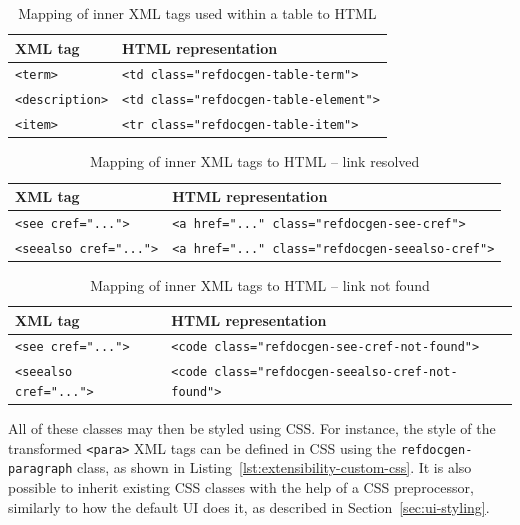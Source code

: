 \begin{table}[H]
\centering
\begin{tabular}{|p{5cm}|p{8cm}|}
\hline
\textbf{XML tag} & \textbf{HTML representation} \\ \hline
\texttt{<term>} & \texttt{<td class="refdocgen-table-term">} \\ \hline
\texttt{<description>} & \texttt{<td class="refdocgen-table-element">} \\ \hline
\texttt{<item>} & \texttt{<tr class="refdocgen-table-item">} \\ \hline
\end{tabular}
\caption{Mapping of inner XML tags used within a table to HTML}
\label{table:default-xml-config-inside-table}
\end{table}

\begin{table}[H]
\centering
\begin{tabular}{|p{5cm}|p{8cm}|}
\hline
\textbf{XML tag} & \textbf{HTML representation} \\ \hline
\texttt{<see cref="...">} & \texttt{<a href="..." class="refdocgen-see-cref">} \\ \hline
\texttt{<seealso cref="...">} & \texttt{<a href="..." class="refdocgen-seealso-cref">} \\ \hline
\end{tabular}
\caption{Mapping of inner XML tags to HTML -- link resolved}
\label{table:default-xml-config-cref-found}
\end{table}

\begin{table}[H]
\centering
\begin{tabular}{|p{5cm}|p{8cm}|}
\hline
\textbf{XML tag} & \textbf{HTML representation} \\ \hline
\texttt{<see cref="...">} & \texttt{<code class="refdocgen-see-cref-not-found">} \\ \hline
\texttt{<seealso cref="...">} & \texttt{<code class="refdocgen-seealso-cref-not-found">} \\ \hline
\end{tabular}
\caption{Mapping of inner XML tags to HTML -- link not found}
\label{table:default-xml-config-cref-not-found}
\end{table}

All of these classes may then be styled using CSS.
For instance, the style of the transformed \texttt{<para>} XML tags can be defined in CSS using the \texttt{refdocgen-paragraph} class, as shown in Listing~\ref{lst:extensibility-custom-css}.
It is also possible to inherit existing CSS classes with the help of a CSS preprocessor, similarly to how the default UI does it, as described in Section~\ref{sec:ui-styling}.


